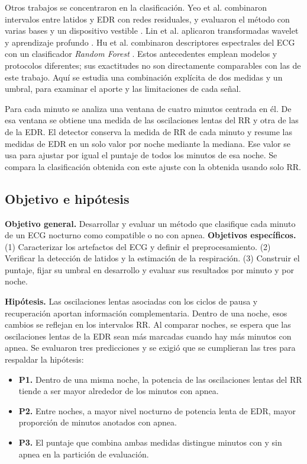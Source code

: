 \documentclass[10pt,a4paper]{article}
\begin{document}
Otros trabajos se concentraron en la clasificación. Yeo et al. combinaron intervalos entre latidos y EDR con redes residuales, y evaluaron el método con varias bases y un dispositivo vestible \cite{yeo}. Lin et al. aplicaron transformadas wavelet y aprendizaje profundo \cite{lin}. Hu et al. combinaron descriptores espectrales del ECG con un clasificador \emph{Random Forest} \cite{hu}. Estos antecedentes emplean modelos y protocolos diferentes; sus exactitudes no son directamente comparables con las de este trabajo. Aquí se estudia una combinación explícita de dos medidas y un umbral, para examinar el aporte y las limitaciones de cada señal.

Para cada minuto se analiza una ventana de cuatro minutos centrada en él. De esa ventana se obtiene una medida de las oscilaciones lentas del RR y otra de las de la EDR. El detector conserva la medida de RR de cada minuto y resume las medidas de EDR en un solo valor por noche mediante la mediana. Ese valor se usa para ajustar por igual el puntaje de todos los minutos de esa noche. Se compara la clasificación obtenida con este ajuste con la obtenida usando solo RR.

\clearpage
\subsection{Objetivo e hipótesis}
\textbf{Objetivo general.} Desarrollar y evaluar un método que clasifique cada minuto de un ECG nocturno como compatible o no con apnea. \textbf{Objetivos específicos.} (1) Caracterizar los artefactos del ECG y definir el preprocesamiento. (2) Verificar la detección de latidos y la estimación de la respiración. (3) Construir el puntaje, fijar su umbral en desarrollo y evaluar sus resultados por minuto y por noche.

\textbf{Hipótesis.} Las oscilaciones lentas asociadas con los ciclos de pausa y recuperación aportan información complementaria. Dentro de una noche, esos cambios se reflejan en los intervalos RR. Al comparar noches, se espera que las oscilaciones lentas de la EDR sean más marcadas cuando hay más minutos con apnea. Se evaluaron tres predicciones y se exigió que se cumplieran las tres para respaldar la hipótesis:

\begin{itemize}\setlength\itemsep{0pt}\setlength\parskip{0pt}
\item \textbf{P1.} Dentro de una misma noche, la potencia de las oscilaciones lentas del RR tiende a ser mayor alrededor de los minutos con apnea.
\item \textbf{P2.} Entre noches, a mayor nivel nocturno de potencia lenta de EDR, mayor proporción de minutos anotados con apnea.
\item \textbf{P3.} El puntaje que combina ambas medidas distingue minutos con y sin apnea en la partición de evaluación.
\end{itemize}
\end{document}
